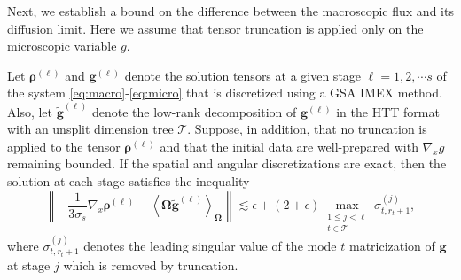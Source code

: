\documentclass[onefignum,onetabnum]{siamart220329}
\begin{document}
Next, we establish a bound on the difference between the macroscopic flux and its diffusion limit. Here we assume that tensor truncation is applied only on the microscopic variable $g$.
\begin{lemma}
\label{lem:unsplit asymptotic error bound}
    Let $\boldsymbol{\rho}^{(\ell)}$ and $\mathbf{g}^{(\ell)}$ denote the solution tensors at a given stage $\ell = 1,2, \cdots s$ of the system \eqref{eq:macro}-\eqref{eq:micro} that is discretized using a GSA IMEX method. Also, let $\widetilde{\mathbf{g}}^{(\ell)}$ denote the low-rank decomposition of $\mathbf{g}^{(\ell)}$ in the HTT format with an unsplit dimension tree $\mathcal{T}$. Suppose, in addition, that no truncation is applied to the tensor $\boldsymbol{\rho}^{(\ell)}$ and that the initial data are well-prepared with $\nabla_{x}g$ remaining bounded. If the spatial and angular discretizations are exact, then the solution at each stage satisfies the inequality
    $$
        \left\lVert -\frac{1}{3\sigma_s} \nabla_x \boldsymbol{\rho}^{(\ell)} - \left\langle \mathbf{\Omega} \widetilde{\mathbf{g}}^{(\ell)} \right\rangle_{\mathbf{\Omega}} \right\rVert \lesssim \epsilon + (2 + \epsilon)\max_{\substack{1 \leq j < \ell \\ t \in \mathcal{T}}} \sigma_{t,r_{t}+1}^{(j)},
    $$
    where $\sigma_{t,r_{t}+1}^{(j)}$ denotes the leading singular value of the mode $t$ matricization of $\mathbf{g}$ at stage $j$ which is removed by truncation.
\end{lemma}
\end{document}
